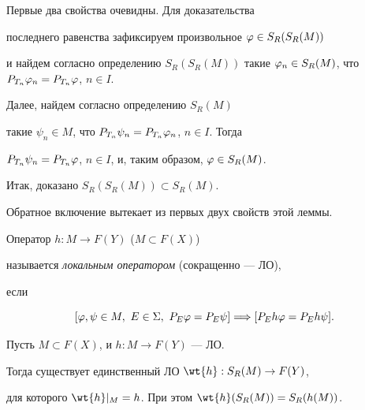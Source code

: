 \begin{pf} Первые два свойства очевидны. Для доказательства


последнего равенства зафиксируем произвольное $\varphi\in S_R(S_R(M))$


и найдем согласно определению $S_R(S_R(M))$ такие $\f_n\in


S_R(M)$, что $P_{T_n}\f_n=P_{T_n}\f$, $n\in I$.


Далее, найдем согласно определению $S_R(M)$


такие $\psi_n\in M$, что $P_{T_n}\psi_n=P_{T_n}\varphi_n$, $n\in I$. Тогда


$P_{T_n}\psi_n=P_{T_n}\varphi$, $n\in I$, и, таким образом, $\varphi\in S_R(M)$.


Итак, доказано $S_R(S_R(M))\subset S_R(M)$.


Обратное включение вытекает из первых двух свойств этой леммы.


\end{pf}





\begin{defn}


Оператор $h:M\to F(Y)$ ($M\subset F(X)$)


называется {\it локальным оператором} \cite{1} (сокращенно --- ЛО),


если


$$


[\f,\psi\in M, \ E\in\Sigma, \ P_{E}\f=P_{E}\psi


]\Longrightarrow[P_{E}h\f=P_{E}h\psi].


$$


\end{defn}





\begin{thm}


Пусть $M\subset F(X)$, и $h:M\to F(Y)$ --- ЛО.


Тогда существует единственный ЛО $\wt{h}:S_R(M)\to F(Y)$,


для которого $\wt{h}|_M=h$. При этом $\wt{h}(S_R(M))=S_R(h(M))$.


\end{thm}





